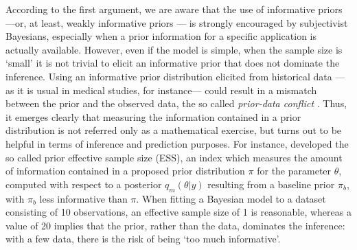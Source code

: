 \documentclass{statsoc}
\begin{document}
According to the first argument, we are aware that the use of informative priors ---or, at least, weakly informative priors \citep{gelman2008weakly}--- is strongly encouraged by subjectivist Bayesians, especially when a prior information for a specific application is actually available. However, even if the model is simple, when the sample size is `small' it is not trivial to elicit an informative prior that does not dominate the inference. Using an informative prior distribution elicited from historical data ---as it is usual in medical studies, for instance--- could result in a mismatch between the prior and the observed data, the so called \textit{prior-data conflict} \citep{evans2006checking, mutsvari2016addressing}. Thus, it emerges clearly that measuring the information contained in a prior distribution is not referred only as a mathematical exercise, but turns out to be  helpful in terms of inference and prediction purposes. For instance, \cite{morita2008determining} developed the so called prior effective 
sample size (ESS), an index which measures the amount of 
information contained in a proposed prior distribution $\pi$ for 
the parameter $\theta$, computed with respect to a posterior 
$q_{m}(\theta|y)$  resulting from a baseline prior $\pi_{b}$, with $\pi_{b}$ less informative than $\pi$. When fitting a Bayesian model to a dataset consisting of 10 observations, an effective sample size of 1 is reasonable, whereas a value of 20 implies that the prior, rather than the data, dominates the inference: with a few data, there is the risk of being `too much informative'. 


\end{document}
